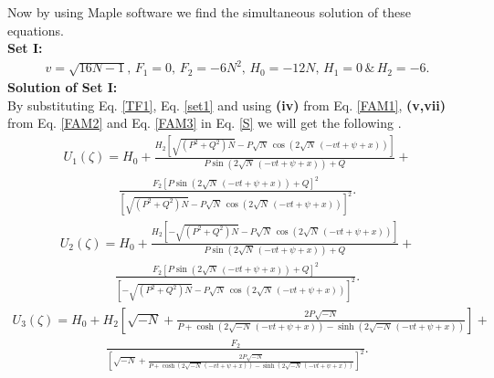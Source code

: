 \documentclass[10pt]{NSP1}
\numberwithin{equation}{section}
\begin{document}
Now by using Maple software we find the simultaneous solution of these equations.\\
\textbf{Set I:}
\begin{eqnarray}\label{set1}
v = \sqrt{16 N -1},\,F_{1} = 0,\,F_{2} = -6 N^{2},\, H_{0} = -12 N,\, H_{1} = 0\,{\&}\,H_{2} = -6.
\end{eqnarray}
\textbf{Solution of Set I:}\\
By substituting Eq. \ref{TF1}, Eq. \ref{set1} and using \textbf{(iv)} from Eq. \ref{FAM1}, \textbf{(v,vii)} from Eq. \ref{FAM2} and Eq. \ref{FAM3} in Eq. \ref{S} we will get the following .
\begin{eqnarray}\label{U1}
U_{1} \left(\zeta \right) =H_{0}+\frac{H_{2} \left[\sqrt{\left(P^{2}+Q^{2}\right) N}-P \sqrt{N}\, \cos \! \left(2 \sqrt{N}\, \left(-v t +\psi +x \right)\right)\right]}{P \sin \! \left(2 \sqrt{N}\, \left(-v t +\psi +x \right)\right)+Q}+\nonumber
\end{eqnarray}
\begin{eqnarray}
\frac{F_{2} \left[P \sin \! \left(2 \sqrt{N}\, \left(-v t +\psi +x \right)\right)+Q \right]^{2}}{{\left[\sqrt{\left(P^{2}+Q^{2}\right) N}-P \sqrt{N}\, \cos \! \left(2 \sqrt{N}\, \left(-v t +\psi +x \right)\right)\right]}^{2}}.
\end{eqnarray}
\begin{eqnarray}\label{U2}
U_{2} \left(\zeta \right) =
H_{0}+\frac{H_{2} \left[-\sqrt{\left(P^{2}+Q^{2}\right) N}-P \sqrt{N}\, \cos \! \left(2 \sqrt{N}\, \left(-v t +\psi +x \right)\right)\right]}{P \sin \! \left(2 \sqrt{N}\, \left(-v t +\psi +x \right)\right)+Q}+\nonumber
\end{eqnarray}
\begin{eqnarray}
\frac{F_{2} \left[P \sin \! \left(2 \sqrt{N}\, \left(-v t +\psi +x \right)\right)+Q \right]^{2}}{{\left[-\sqrt{\left(P^{2}+Q^{2}\right) N}-P \sqrt{N}\, \cos \! \left(2 \sqrt{N}\, \left(-v t +\psi +x \right)\right)\right]}^{2}}.
\end{eqnarray}
\begin{eqnarray}\label{U3}
U_{3} \left(\zeta \right) =
H_{0}+H_{2} \left[\sqrt{-N}+\frac{2 P \sqrt{-N}}{P +\cosh \! \left(2 \sqrt{-N}\, \left(-v t +\psi +x \right)\right)-\sinh \! \left(2 \sqrt{-N}\, \left(-v t +\psi +x \right)\right)}\right]+\nonumber
\end{eqnarray}
\begin{eqnarray}
\frac{F_{2}}{\left[\sqrt{-N}+\frac{2 P \sqrt{-N}}{P +\cosh \left(2 \sqrt{-N}\, \left(-v t +\psi +x \right)\right)-\sinh \left(2 \sqrt{-N}\, \left(-v t +\psi +x \right)\right)}\right]^{2}}.
\end{eqnarray}
\end{document}
